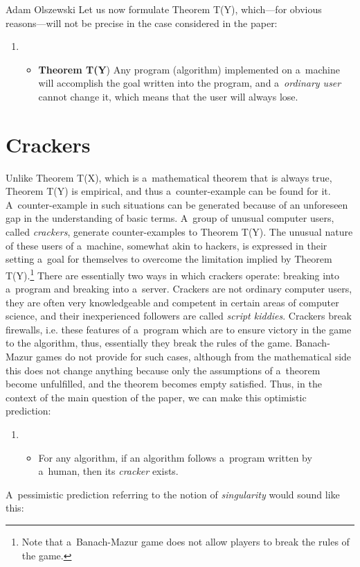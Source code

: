 \begin{artengenv}{Adam Olszewski}
Let us now formulate Theorem T(Y), which—for obvious reasons—will not be precise in the case considered in the paper:

\begin{enumerate}
\item \begin{itemize}
\item \textbf{Theorem T(Y}) Any program (algorithm) implemented on a~machine will accomplish the goal written into the program, and a~\textit{ordinary user} cannot change it, which means that the user will always lose.
\end{itemize}
\end{enumerate}
\section{Crackers}
Unlike Theorem T(X), which is a~mathematical theorem that is always true, Theorem T(Y) is empirical, and thus a~counter-example can be found for it. A~counter-example in such situations can be generated because of an unforeseen gap in the understanding of basic terms. A~group of unusual computer users, called \textit{crackers}, generate counter-examples to Theorem T(Y). The unusual nature of these users of a~machine, somewhat akin to hackers, is expressed in their setting a~goal for themselves to overcome the limitation implied by Theorem T(Y).\footnote{Note that a~Banach-Mazur game does not allow players to break the rules of the game.} There are essentially two ways in which crackers operate: breaking into a~program and breaking into a~server. Crackers are not ordinary computer users, they are often very knowledgeable and competent in certain areas of computer science, and their inexperienced followers are called \textit{script kiddies}. Crackers break firewalls, i.e. these features of a~program which are to ensure victory in the game to the algorithm, thus, essentially they break the rules of the game. Banach-Mazur games do not provide for such cases, although from the mathematical side this does not change anything because only the assumptions of a~theorem become unfulfilled, and the theorem becomes empty satisfied. Thus, in the context of the main question of the paper, we can make this optimistic prediction:

\begin{enumerate}
\item \begin{itemize}
\item For any algorithm, if an algorithm follows a~program written by a~human, then its \textit{cracker} exists.
\end{itemize}
\end{enumerate}
A~pessimistic prediction referring to the notion of \textit{singularity} would sound like this:


\end{artengenv}

